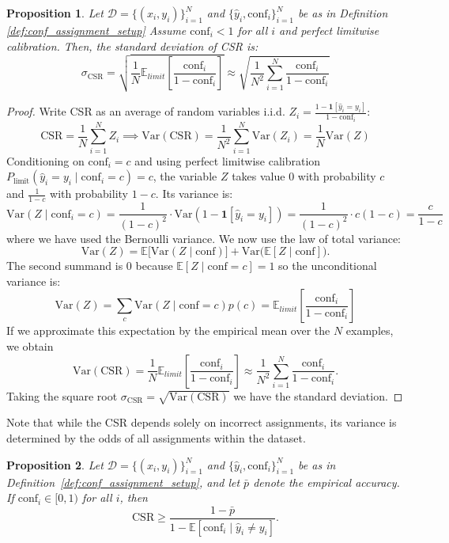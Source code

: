 \documentclass{article}
\theoremstyle{plain}
\newtheorem{theorem}{Proposition}
\theoremstyle{definition}
\theoremstyle{remark}
\begin{document}
\begin{theorem} \label{theorem:std_csr_under_perfect_limitwise}
Let $\mathcal{D} = \{(x_i, y_i)\}_{i=1}^N$ and $\{\hat{y}_i, \text{conf}_i\}_{i=1}^N$ be as in Definition \ref{def:conf_assignment_setup} Assume $\text{conf}_i < 1$ for all $i$ and perfect limitwise calibration. Then, the standard deviation of CSR is: \[
\sigma_{\text{CSR}} = \sqrt{\frac{1}{N}\mathbb{E}_{limit} \left[\frac{\text{conf}_i}{1-\text{conf}_i}\right]} \approx   \sqrt{\frac{1}{N^2}\sum_{i=1}^N \frac{\text{conf}_i}{1-\text{conf}_i}}  \]
\end{theorem}
\begin{proof}
Write CSR as an average of random variables i.i.d. $Z_i = \frac{1-\mathbf{1}[\hat{y}_i=y_i]}{1-\text{conf}_i}$: \[
\text{CSR} = \frac{1}{N}\sum_{i=1}^N Z_i \implies \text{Var}(\text{CSR}) = \frac{1}{N^2}\sum_{i=1}^N \text{Var}(Z_i) =  \frac{1}{N} \text{Var}(Z) \]
Conditioning on $\text{conf}_i = c$ and using perfect limitwise calibration $P_{\text{limit}}(\hat{y}_i = y_i \mid \text{conf}_i = c) = c$, the variable $Z$ takes value $0$ with probability $c$ and $\frac{1}{1-c}$ with probability $1-c$. Its variance is: \[
\text{Var}(Z \mid \text{conf}_i = c) = \frac{1}{(1-c)^2}\cdot \text{Var}(1-\mathbf{1}[\hat{y}_i=y_i]) = \frac{1}{(1-c)^2}\cdot c(1-c) = \frac{c}{1-c} 
\] where we have used the Bernoulli variance. We now use the law of total variance: \[
\mathrm{Var}(Z) = \mathbb{E}\bigl[\mathrm{Var}(Z \mid \text{conf})\bigr] + \mathrm{Var}\bigl(\mathbb{E}[Z \mid \text{conf}]\bigr).
\]
The second summand is 0 because $\mathbb{E}[Z \mid \text{conf} =c] = 1$ so the unconditional variance is: \[
\text{Var}(Z) = \sum_c  \text{Var}(Z \mid \text{conf} = c) p(c) = \mathbb{E}_{limit}   \left[\frac{\text{conf}_i}{1-\text{conf}_i}\right]
\] If we approximate this expectation by the empirical mean over the $N$ examples, we obtain
\[
\mathrm{Var}(\text{CSR}) =  \frac{1}{N} \mathbb{E}_{limit}   \left[\frac{\text{conf}_i}{1-\text{conf}_i}\right]  \approx \frac{1}{N^2}\sum_{i=1}^N \frac{\text{conf}_i}{1 - \text{conf}_i}. \]
Taking the square root  $\sigma_{\text{CSR}} = \sqrt{\text{Var}(\text{CSR})  }$ we have the standard deviation.
\end{proof}
\bigskip

Note that while the CSR depends solely on incorrect assignments, its variance is determined by the odds of all assignments within the dataset.
\bigskip


\begin{theorem} \label{proposition:jensen_CSR}
Let $\mathcal{D} = \{(x_i, y_i)\}_{i=1}^N$ and $\{\hat{y}_i, \mathrm{conf}_i\}_{i=1}^N$ be as in 
Definition~\ref{def:conf_assignment_setup}, and let $\bar{p}$ denote the empirical accuracy. 
If $\mathrm{conf}_i \in [0,1)$ for all $i$, then
\[
    \mathrm{CSR} \geq \frac{1 - \bar{p}}{1 - \mathbb{E}[\mathrm{conf}_i \mid \hat{y}_i \neq y_i]}.
\]
\end{theorem}
\end{document}
